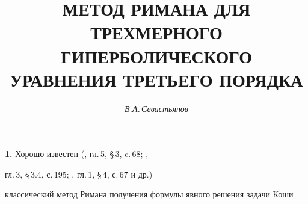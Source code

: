 









\newcommand{\A}{{\cal A}}


\newcommand{\col}{\operatorname{col}}


\newcommand{\vraisup}{\operatorname{vrai~sup}}





\setcounter{page}{69}








\author{\it В.А.\,Севастьянов}


\title{МЕТОД РИМАНА ДЛЯ ТРЕХМЕРНОГО ГИПЕРБОЛИЧЕСКОГО\\


УРАВНЕНИЯ ТРЕТЬЕГО ПОРЯДКА}







\date{}


\pagestyle{plain}








\maketitle













{\bf 1.} Хорошо известен (\cite{Sob}, гл.\,5, \S\,3, c.\,68; \cite{Tri},


гл.\,3, \S\,3.4, с.\,195; \cite{Bi}, гл.\,1,  \S\,4, с.\,67 и др.)


классический метод Римана получения формулы явного решения задачи Коши


